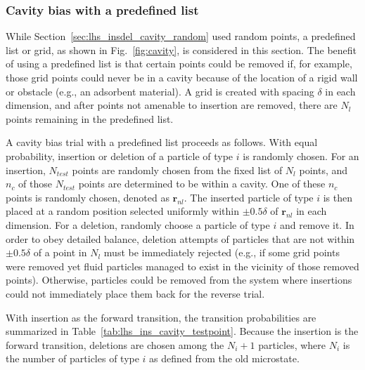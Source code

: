 \subsubsection{\label{sec:lhs_insdel_cavity_testpoint}Cavity bias with a predefined list}

While Section~\ref{sec:lhs_insdel_cavity_random} used random points, a predefined list or grid, as shown in Fig.~\ref{fig:cavity}, is considered in this section.
The benefit of using a predefined list is that certain points could be removed if, for example, those grid points could never be in a cavity because of the location of a rigid wall or obstacle (e.g., an adsorbent material).
A grid is created with spacing $\delta$ in each dimension, and after points not amenable to insertion are removed, there are $N_l$ points remaining in the predefined list.

A cavity bias trial with a predefined list proceeds as follows.
With equal probability, insertion or deletion of a particle of type $i$ is randomly chosen.
For an insertion, $N_{test}$ points are randomly chosen from the fixed list of $N_l$ points, and $n_c$ of those $N_{test}$ points are determined to be within a cavity.
One of these $n_c$ points is randomly chosen, denoted as $\mathbf{r}_{nl}$.
The inserted particle of type $i$ is then placed at a random position selected uniformly within $\pm 0.5\delta$ of $\mathbf{r}_{nl}$ in each dimension.
For a deletion, randomly choose a particle of type $i$ and remove it.
In order to obey detailed balance, deletion attempts of particles that are not within $\pm 0.5\delta$ of a point in $N_l$ must be immediately rejected (e.g., if some grid points were removed yet fluid particles managed to exist in the vicinity of those removed points).
Otherwise, particles could be removed from the system where insertions could not immediately place them back for the reverse trial.

With insertion as the forward transition, the transition probabilities are summarized in Table~\ref{tab:lhs_ins_cavity_testpoint}.
Because the insertion is the forward transition, deletions are chosen among the $N_i+1$ particles, where $N_i$ is the number of particles of type $i$ as defined from the old microstate.

